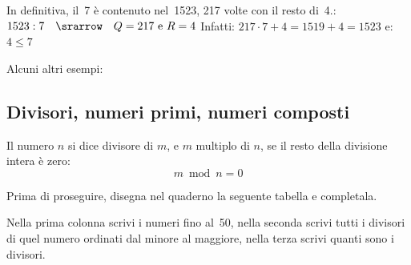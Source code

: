 In definitiva, il~7 è contenuto nel~1523, 217 volte con il resto di~4.:\\
\(1523:7 \quad \srarrow \quad Q=217 \text{ e } R=4\) \quad
Infatti: \(217 \cdot 7 + 4 = 1519 + 4 = 1523\)
e: \(4 \leqslant 7\)

\vspace{.5em}
Alcuni altri esempi:

\vspace{-6pt}
\begin{center}
\begin{inaccessibleblock}
 
\end{inaccessibleblock}
\end{center}
\vspace{-12pt}


\subsection{Divisori, numeri primi, numeri composti}


\begin{definizione}{}{}
Il numero \(n\) si dice divisore di \(m\), e \(m\) multiplo di \(n\),
se il resto della divisione intera è zero: 
\[m \bmod n = 0\]
\end{definizione}

Prima di proseguire, disegna nel quaderno la seguente tabella e completala. 
 
Nella prima colonna scrivi i numeri fino al~50, nella seconda scrivi tutti 
i divisori di quel numero ordinati dal minore al maggiore, nella terza 
scrivi quanti sono i divisori.


